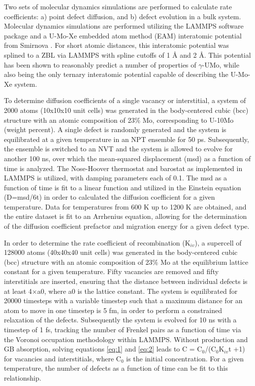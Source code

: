\documentclass[10pt,review]{elsarticle}
\begin{document}
Two sets of molecular dynamics simulations are performed to calculate rate coefficients: a) point defect diffusion, and b) defect evolution in a bulk system. Molecular dynamics simulations are performed utilizing the LAMMPS \cite{plimpton1995} software package and a U-Mo-Xe embedded atom method (EAM) interatomic potential from Smirnova \cite{smirnovaUMo}. For short atomic distances, this interatomic potential was splined to a ZBL \cite{zbl} via LAMMPS with spline cutoffs of 1 {\AA} and 2 {\AA}. This potential has been shown to reasonably predict a number of properties of $\gamma$-UMo, while also being the only ternary interatomic potential capable of describing the U-Mo-Xe system. 

To determine diffusion coefficients of a single vacancy or interstitial, a system of 2000 atoms (10x10x10 unit cells) was generated in the body-centered cubic (bcc) structure with an atomic composition of 23\% Mo, corresponding to U-10Mo (weight percent). A single defect is randomly generated and the system is equilibrated at a given temperature in an NPT ensemble for 50 ps. Subsequently, the ensemble is switched to an NVT and the system is allowed to evolve for another 100 ns, over which the mean-squared displacement (msd) as a function of time is analyzed. The Nose-Hoover thermostat and barostat as implemented in LAMMPS is utilized, with damping parameters each of 0.1. The msd as a function of time is fit to a linear function and utilized in the Einstein equation (D=msd/6t) in order to calculated the diffusion coefficient for a given temperature. Data for temperatures from 600 K up to 1200 K are obtained, and the entire dataset is fit to an Arrhenius equation, allowing for the determination of the diffusion coefficient prefactor and migration energy for a given defect type. 

In order to determine the rate coefficient of recombination (K$_{iv}$), a supercell of 128000 atoms (40x40x40 unit cells) was generated in the body-centered cubic (bcc) structure with an atomic composition of 23\% Mo at the equilibrium lattice constant for a given temperature. Fifty vacancies are removed and fifty interstitials are inserted, ensuring that the distance between individual defects is at least 4$\times$a0, where a0 is the lattice constant. The system is equilibrated for 20000 timesteps with a variable timestep such that a maximum distance for an atom to move in one timestep is 5 fm, in order to perform a constrained relaxation of the defects. Subsequently the system is evolved for 10 ns with a timestep of 1 fs, tracking the number of Frenkel pairs as a function of time via the Voronoi occupation methodology within LAMMPS. Without production and GB absorption, solving equations \ref{eq:1} and \ref{eq:2} leads to C = C$_0$/(C$_0$K$_{iv}$t +1) for vacancies and interstitials, where C$_0$ is the initial concentration. For a given temperature, the number of defects as a function of time can be fit to this relationship. 
\end{document}
